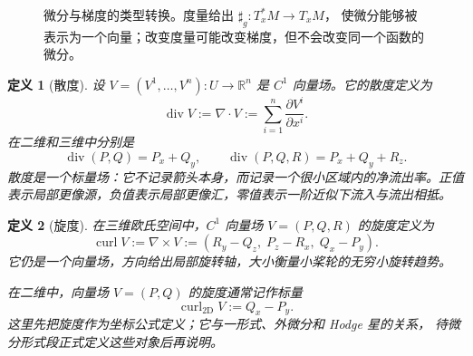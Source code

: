 \documentclass[UTF8,fontset=none,a4paper,11pt]{ctexart}
\theoremstyle{foundation-definition}
\newtheorem{definition}{定义}[section]
\theoremstyle{foundation-theorem}
\theoremstyle{foundation-proposition}
\theoremstyle{foundation-example}
\theoremstyle{foundation-remark}
\theoremstyle{foundation-theorem}
\begin{document}
\begin{figure}[htbp]
\centering
{}
\caption{微分与梯度的类型转换。度量给出 \(\sharp_g:T_x^*M\to T_xM\)，
使微分能够被表示为一个向量；改变度量可能改变梯度，但不会改变同一个函数的微分。}
\label{fig:differential-gradient-metric}
\end{figure}

\begin{definition}[散度]\label{def:divergence}
设 \(V=(V^1,\ldots,V^n):U\to\mathbb R^n\) 是 \(C^1\) 向量场。它的散度定义为
\[
\operatorname{div}V
:=\nabla\cdot V
:=\sum_{i=1}^n\frac{\partial V^i}{\partial x^i}.
\]
在二维和三维中分别是
\[
\operatorname{div}(P,Q)=P_x+Q_y,
\qquad
\operatorname{div}(P,Q,R)=P_x+Q_y+R_z.
\]
散度是一个标量场：它不记录箭头本身，而记录一个很小区域内的净流出率。正值表示局部更像源，负值表示局部更像汇，零值表示一阶近似下流入与流出相抵。
\end{definition}

\begin{definition}[旋度]\label{def:curl}
在三维欧氏空间中，\(C^1\) 向量场 \(V=(P,Q,R)\) 的旋度定义为
\[
\operatorname{curl}V
:=\nabla\times V
:=\left(R_y-Q_z,\;P_z-R_x,\;Q_x-P_y\right).
\]
它仍是一个向量场，方向给出局部旋转轴，大小衡量小桨轮的无穷小旋转趋势。

在二维中，向量场 \(V=(P,Q)\) 的旋度通常记作标量
\[
\operatorname{curl}_{2\mathrm D}V:=Q_x-P_y.
\]
这里先把旋度作为坐标公式定义；它与一形式、外微分和 Hodge 星的关系，
待微分形式段正式定义这些对象后再说明。
\end{definition}
\end{document}
